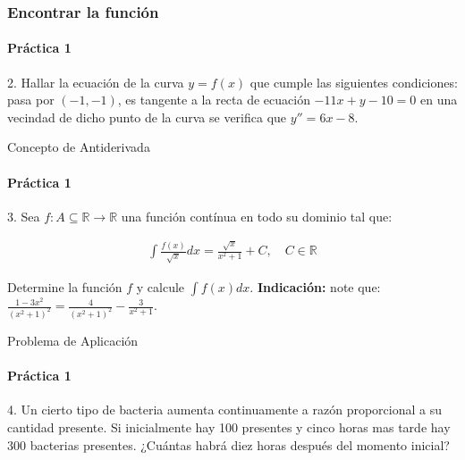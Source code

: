 \documentclass{plantillaPPT}
\begin{document}
\begin{frame}
    \frametitle{Encontrar la función}
    \framesubtitle{Práctica 1}
    \vspace{-2.5cm}
    2. Hallar la ecuación de la curva \(y=f(x)\) que cumple %
    las  siguientes condiciones: pasa por \((-1, -1)\), es %
    tangente a la recta de ecuación \(-11x+y-10=0\) en una %
    vecindad de dicho punto de la curva se verifica que \(y'' = 6x -8\).

\end{frame}

\begin{frame}{Concepto de Antiderivada}

    \framesubtitle{Práctica 1}

    3. Sea \(f: A \subseteq \mathbb{R} \to \mathbb{R}\) una función %
    contínua en todo su dominio tal que:

    \vspace{-1cm}

    \begin{align*}
        \int \frac{f(x)}{\sqrt{x}}dx = \frac{\sqrt{x}}{x^2 + 1} +C, 
        \quad C\in \mathbb{R}
    \end{align*}

    Determine la función \(f\) y calcule \(\int f(x)dx\). %
    \textbf{Indicación:} note que: \(\frac{1-3x^2}{(x^2+1)^2} = 
    \frac{4}{(x^2+1)^2}-\frac{3}{x^2+1}\). 
    
\end{frame}

\begin{frame}{Problema de Aplicación}
    \framesubtitle{Práctica 1}

    \vspace{-2.5cm}
    
    4. Un cierto tipo de bacteria aumenta continuamente a razón %
    proporcional a su cantidad presente. Si inicialmente hay 100 %
    presentes y cinco horas mas tarde hay 300 bacterias presentes. %
    ¿Cuántas habrá diez horas después del momento inicial?
    
\end{frame}
\end{document}
